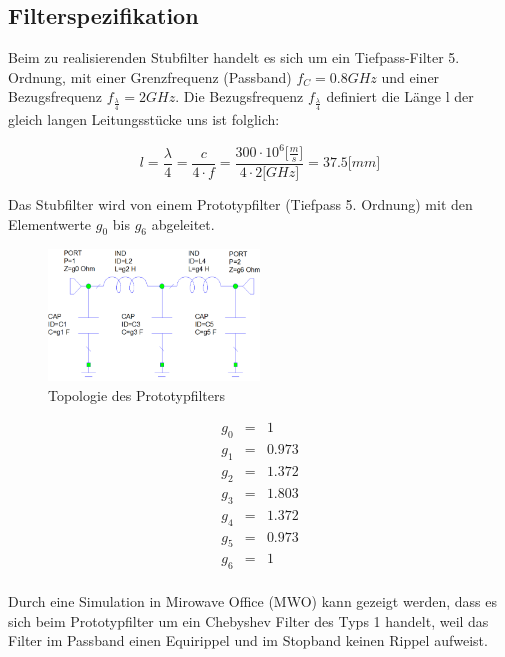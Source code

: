 \subsection{Filterspezifikation}

Beim zu realisierenden Stubfilter handelt es sich um ein Tiefpass-Filter 5. Ordnung, mit einer Grenzfrequenz (Passband) $f_C = 0.8GHz $ und einer Bezugsfrequenz $f_{\frac{\lambda}{4}} = 2GHz$. Die Bezugsfrequenz $f_{\frac{\lambda}{4}}$ definiert die Länge l der gleich langen Leitungsstücke uns ist folglich:

\begin{equation*}
l = \frac{\lambda}{4} = \frac{c}{4 \cdot f} = \frac{300\cdot 10^6 \lbrack\frac{m}{s}\rbrack}{4 \cdot 2 \lbrack GHz \rbrack} =37.5 \lbrack mm \rbrack
\end{equation*}

Das Stubfilter wird von einem Prototypfilter (Tiefpass 5. Ordnung) 
mit den Elementwerte $g_0$ bis $g_6$ abgeleitet.

\begin{figure}[h!]
\centering
 	\includegraphics[width=0.5\textwidth]{Topologie_Prototyp.png}
 	\caption{Topologie des Prototypfilters}
 	\label{fig:Topologie_Prototyp.png}
\end{figure}

\begin{mdframed}
\begin{equation*} 
\begin{array}{rclcl} 
g_0 & = & 1 \\ 
g_1 & = & 0.973 \\ 
g_2 & = & 1.372 \\ 
g_3 & = & 1.803 \\ 
g_4 & = & 1.372 \\ 
g_5 & = & 0.973 \\ 
g_6 & = & 1 \\ 
\end{array} 
\end{equation*} 
\end{mdframed}

Durch eine Simulation in Mirowave Office (MWO) kann gezeigt werden, dass es sich beim Prototypfilter um ein Chebyshev Filter des Typs 1 handelt, weil das Filter im Passband einen Equirippel und im Stopband keinen Rippel aufweist. 

